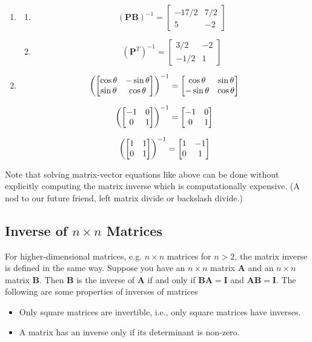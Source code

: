 \begin{sol}
\begin{enumerate}
    \item \begin{enumerate}
        \item $$(\mathbf{PB})^{-1} = \begin{bmatrix}
        -17/2 & 7/2 \\ 5 & -2
        \end{bmatrix}$$
        \item $$(\mathbf{P}^T)^{-1} = \begin{bmatrix}
        3/2 & -2 \\ -1/2 & 1
        \end{bmatrix}$$
    \end{enumerate}
    
    \item    
    
    \[ \left(\begin{bmatrix} \cos \theta & -\sin \theta \\ \sin \theta & \cos \theta\end{bmatrix}\right)^{-1} = \begin{bmatrix} \cos\theta & \sin\theta \\ -\sin\theta & \cos\theta\end{bmatrix} \]
    
    \[ \left(\begin{bmatrix} -1 & 0 \\ 0 & 1\end{bmatrix}\right)^{-1} = \begin{bmatrix} -1 & 0 \\ 0 & 1\end{bmatrix} \]
    
    \[ \left(\begin{bmatrix} 1 & 1 \\ 0 & 1\end{bmatrix}\right)^{-1} = \begin{bmatrix} 1 & -1 \\ 0 & 1\end{bmatrix} \]

\end{enumerate}
\end{sol}

Note that solving matrix-vector equations like above can be done without explicitly computing the matrix inverse which is computationally expensive. (A nod to our future friend, left matrix divide or backslash divide.)

\subsection{Inverse of $n\times n$ Matrices}

For higher-dimensional matrices, e.g. $n\times n$ matrices for $n > 2$, the matrix inverse is defined in the same way. Suppose you have an $n\times n$ matrix $\mathbf{A}$ and an $n\times n$ matrix $\mathbf{B}$. Then  $\mathbf{B}$ is the inverse of $\mathbf{A}$ if and only if $\mathbf{BA} = \mathbf{I}$ and $\mathbf{AB} = \mathbf{I}$.  The following are some properties of inverses of matrices

\begin{itemize}
\item Only square matrices are invertible, i.e., only square matrices have inverses.
\item A matrix has an inverse only if its determinant is non-zero.
\end{itemize}

